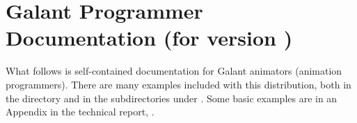 \documentclass{article}
\begin{document}
\section{Galant Programmer Documentation (for version \VERSION)}

What follows is self-contained documentation for Galant animators (animation
programmers). There are many examples included with this distribution, both
in the  directory and in the subdirectories under
. Some basic examples are in an Appendix in the technical
report, .

\tableofcontents

\listoftables

\newpage


\end{document}
